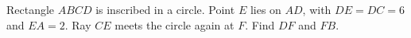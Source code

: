 Rectangle $ABCD$ is inscribed in a circle. Point $E$ lies on $AD$, with $DE=DC=6$ and $EA=2$. Ray $CE$ meets the circle again at $F$. Find $DF$ and $FB$.
